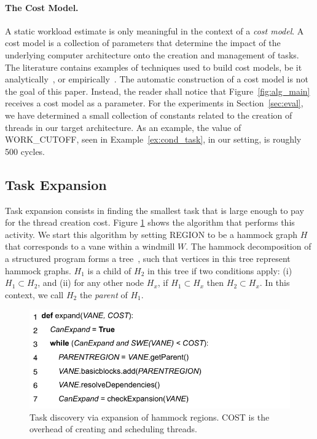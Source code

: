 \documentclass[sigplan,10pt,screen]{acmart}
\begin{document}
\paragraph{The Cost Model.}
A static workload estimate is only meaningful in the context of a {\em cost
model}.
A cost model is a collection of parameters that determine the impact of the
underlying computer architecture onto the creation and management of tasks.
The literature contains examples of techniques used to build cost models,
be it analytically~\cite{Baghsorkhi10}, or empirically~\cite{Poesia17}.
The automatic construction of a cost model is not the goal of this paper.
Instead, the reader shall notice that Figure~\ref{fig:alg_main} receives a
cost model as a parameter.
For the experiments in Section~\ref{sec:eval}, we have determined a small
collection of constants related to the creation of threads in our target
architecture.
As an example, the value of \textsf{WORK\_CUTOFF}, seen in
Example~\ref{ex:cond_task}, in our setting, is roughly 500 cycles.

\subsection{Task Expansion}
\label{sub:expansion}

Task expansion consists in finding the smallest task that is large enough to
pay for the thread creation cost.
Figure \ref{fig:expand_alg} shows the algorithm that performs this activity.
We start this algorithm by setting \textsf{REGION} to be a hammock graph $H$
that corresponds to a vane within a windmill $W$.
The hammock decomposition of a structured program forms a tree~\cite{Ferrante87},
such that vertices in this tree represent hammock graphs.
$H_1$ is a child of $H_2$ in this tree if two conditions apply:
(i) $H_1 \subset H_2$, and (ii) for any 
other node $H_x$, if $H_1 \subset H_x$ then $H_2 \subset H_x$.
In this context, we call $H_2$ the {\em parent} of $H_1$.

\begin{figure}[h]
\begin{center}
\includegraphics[width=1\columnwidth]{images/expand_alg}
\caption{Task discovery via expansion of hammock regions.
\textsf{COST} is the overhead of creating and scheduling threads.}
\label{fig:expand_alg}
\end{center}
\end{figure}
\end{document}
